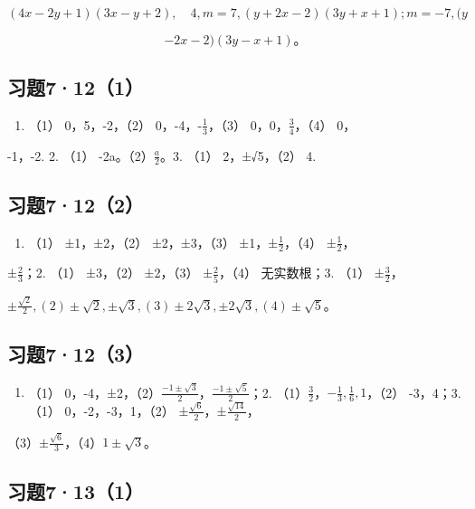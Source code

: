 \((4x - 2y + 1)(3x - y + 2), \quad 4, m = 7, (y + 2x - 2)(3y + x + 1); m = -7, (y\)

\[
- 2 x - 2) (3 y - x + 1)\text{。}
\]

\subsection{习题7·12（1）}

\begin{enumerate}
\item
  （1） 0，5，-2，（2） 0，-4，-\(\frac{1}{3}\)，（3）
  0，0，\(\frac{3}{4}\)，（4） 0，
\end{enumerate}

-1，-2. 2. （1） -2a。（2）\(\frac{a}{2}\)。3. （1） 2，±√5，（2） 4.

\subsection{习题7·12（2）}

\begin{enumerate}
\item
  （1） ±1，±2，（2） ±2，±3，（3） ±1，±\(\frac{1}{2}\)，（4）
  ±\(\frac{1}{2}\)，
\end{enumerate}

±\(\frac{2}{3}\)；2. （1） ±3，（2） ±2，（3） ±\(\frac{2}{5}\)，（4）
无实数根；3. （1） ±\(\frac{3}{2}\)，

\(\pm \frac{\sqrt{2}}{2}, (2) \pm \sqrt{2}, \pm \sqrt{3}, (3) \pm 2\sqrt{3}, \pm 2\sqrt{3}, (4) \pm \sqrt{5}\)。

\subsection{习题7·12（3）}

\begin{enumerate}
\item
  （1）
  0，-4，±2，（2）\(\frac{-1 \pm \sqrt{3}}{2}\)，\(\frac{-1 \pm \sqrt{5}}{2}\)；2.
  （1）\(\frac{3}{2}\)，\(-\frac{1}{3}, \frac{1}{6}, 1\)，（2）
  -3，4；3. （1） 0，-2，-3，1，（2）
  ±\(\frac{\sqrt{6}}{2}\)，±\(\frac{\sqrt{14}}{2}\)，
\end{enumerate}

（3）\(\pm \frac{\sqrt{6}}{3}\)，（4）\(1 \pm \sqrt{3}\)。

\subsection{习题7·13（1）}

